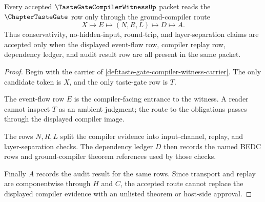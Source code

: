 \begin{theorem}
\label{thm:taste-gate-compiler-witness-ground-compiler-route}
Every accepted $\TasteGateCompilerWitnessUp$ packet reads the $\ChapterTasteGate$ row only through the ground-compiler route
$$
X \longmapsto E \longmapsto (N,R,L) \longmapsto D \longmapsto A.
$$
Thus conservativity, no-hidden-input, round-trip, and layer-separation claims are accepted only when the displayed event-flow row, compiler replay row, dependency ledger, and audit result row are all present in the same packet.
\end{theorem}
\begin{proof}
Begin with the carrier of \autoref{def:taste-gate-compiler-witness-carrier}. The only candidate token is $X$, and the only taste-gate row is $T$.

The event-flow row $E$ is the compiler-facing entrance to the witness. A reader cannot inspect $T$ as an ambient judgment; the route to the obligations passes through the displayed compiler image.

The rows $N,R,L$ split the compiler evidence into input-channel, replay, and layer-separation checks. The dependency ledger $D$ then records the named BEDC rows and ground-compiler theorem references used by those checks.

Finally $A$ records the audit result for the same rows. Since transport and replay are componentwise through $H$ and $C$, the accepted route cannot replace the displayed compiler evidence with an unlisted theorem or host-side approval.
\end{proof}

